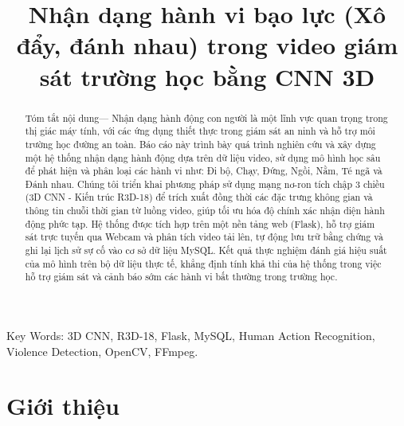 \documentclass[conference]{IEEEtran}
\begin{document}
\title{Nhận dạng hành vi bạo lực (Xô đẩy, đánh nhau) trong video giám sát trường học bằng CNN 3D}

\author{
}
\maketitle

\begin{abstract}
    Tóm tắt nội dung— Nhận dạng hành động con người là một lĩnh vực quan trọng trong thị giác máy tính, với các ứng dụng thiết thực trong giám sát an ninh và hỗ trợ môi trường học đường an toàn. Báo cáo này trình bày quá trình nghiên cứu và xây dựng một hệ thống nhận dạng hành động dựa trên dữ liệu video, sử dụng mô hình học sâu để phát hiện và phân loại các hành vi như: Đi bộ, Chạy, Đứng, Ngồi, Nằm, Té ngã và Đánh nhau. Chúng tôi triển khai phương pháp sử dụng mạng nơ-ron tích chập 3 chiều (3D CNN - Kiến trúc R3D-18) để trích xuất đồng thời các đặc trưng không gian và thông tin chuỗi thời gian từ luồng video, giúp tối ưu hóa độ chính xác nhận diện hành động phức tạp. Hệ thống được tích hợp trên một nền tảng web (Flask), hỗ trợ giám sát trực tuyến qua Webcam và phân tích video tải lên, tự động lưu trữ bằng chứng và ghi lại lịch sử sự cố vào cơ sở dữ liệu MySQL. Kết quả thực nghiệm đánh giá hiệu suất của mô hình trên bộ dữ liệu thực tế, khẳng định tính khả thi của hệ thống trong việc hỗ trợ giám sát và cảnh báo sớm các hành vi bất thường trong trường học.
\end{abstract}

\begin{IEEEkeywords}
    Key Words: 3D CNN, R3D-18, Flask, MySQL, Human Action Recognition, Violence Detection, OpenCV, FFmpeg.
\end{IEEEkeywords}

\section{Giới thiệu}
\end{document}
